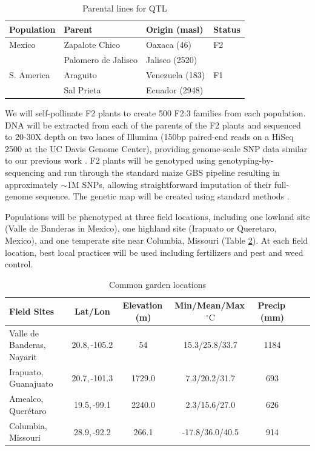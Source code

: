 \begin{table}
\begin{center}
\caption{Parental lines for QTL} \label{tab:qtlpops}
\begin{tabular}{llll}
\\\toprule  
\rowcolor{white}
{\bf Population}	& {\bf Parent } &	{\bf Origin (masl)} & {\bf Status }\\ \midrule
\rowcolor{gray!25}
Mexico	& Zapalote Chico		& Oaxaca	 (46)		&  F2 \\ 
\rowcolor{gray!25}
	& 	Palomero de Jalisco	& 	Jalisco (2520)		& \\
S. America	& Araguito	& Venezuela (183)	&  F1 \\ 
\rowcolor{white}
	& Sal Prieta	 & Ecuador (2948) & \\ \bottomrule
\end{tabular}
\end{center}
\end{table} 

We will self-pollinate F2 plants to create 500 F2:3 families from each population.  DNA will be extracted from each of the parents of the F2 plants and sequenced to 20-30X depth on two lanes of Illumina (150bp paired-end reads on a HiSeq 2500 at the UC Davis Genome Center), providing genome-scale SNP data similar to our previous work \citep[HapMap.v2;][]{Chia2012a}.  F2 plants will be genotyped using genotyping-by-sequencing \citep[GBS;][]{Elshire2011} and run through the standard maize GBS pipeline \citep{Glaubitz2014} resulting in approximately $\sim$1M SNPs, allowing straightforward imputation of their full-genome sequence.  The genetic map will be created using standard methods \citep{lander1987mapmaker}. 

Populations will be phenotyped at three field locations, including one lowland site (Valle de Banderas in Mexico), one highland site (Irapuato or Queretaro, Mexico), and one temperate site near Columbia, Missouri (Table \ref{tab:locales}).  At each field location, best local practices will be used including fertilizers and pest and weed control.

\begin{table}[]
\begin{center}
\begin{tabular}{p{2cm}cccccc}\\\toprule  
{\bf Field Sites} & {\bf Lat/Lon } & {\bf Elevation\,(m) } &	{\bf Min/Mean/Max\,$^{\circ}\mathrm{C}$  } & {\bf Precip\,(mm) } \\ \toprule
Valle de Banderas, Nayarit	& 20.8,\,-105.2&	54		&	15.3/25.8/33.7	&	1184 \\
Irapuato, Guanajuato 	&	20.7,\,-101.3	&	1729.0	&	7.3/20.2/31.7	&	693 \\
Amealco, Quer\'etaro 	&	19.5,\,-99.1	&	2240.0 	&	2.3/15.6/27.0	&	626\\
Columbia, Missouri		& 	28.9,\,-92.2	&	266.1 	&	-17.8/36.0/40.5&	914\\ \bottomrule
\end{tabular}
\caption{Common garden locations} \label{tab:locales}
\end{center}
\end{table} 

